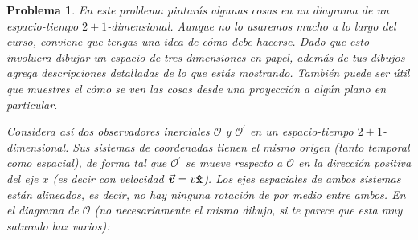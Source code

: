 \documentclass[12pt]{article}
\theoremstyle{break}
\newtheorem{exercise}{Problema}
\theoremstyle{nonumberbreak}
\DeclareRobustCommand{\uvec}[1]{{%
  \ifcsname uvec#1\endcsname
     \csname uvec#1\endcsname
   \else
    \bm{\hat{\mathbf{#1}}}%
   \fi
}}%
\newcommand*{\observer}{\mathcal{O}}
\newcommand*{\primeobserver}{\mathcal{O}^{\prime}}
\begin{document}
    \begin{exercise}
        En este problema pintarás algunas cosas en un diagrama de un espacio-tiempo \(2 + 1\)-dimensional. Aunque no lo usaremos mucho a lo largo del curso, conviene que tengas una idea de cómo debe hacerse. Dado que esto involucra dibujar un espacio de tres dimensiones en papel, además de tus dibujos agrega descripciones detalladas de lo que estás mostrando. También puede ser útil que muestres el cómo se ven las cosas desde una proyección a algún plano en particular.

        Considera así dos observadores inerciales \(\observer\) y \(\primeobserver\) en un espacio-tiempo \(2 + 1\)-dimensional. Sus sistemas de coordenadas tienen el mismo origen (tanto temporal como espacial), de forma tal que \(\primeobserver\) se mueve respecto a \(\observer\) en la dirección positiva del eje \(x\) (es decir con velocidad \(\va*{v} = v\uvec{x}\)). Los ejes espaciales de ambos sistemas están alineados, es decir, no hay ninguna rotación de por medio entre ambos. En el diagrama de \(\observer\) (no necesariamente el mismo dibujo, si te parece que esta muy saturado haz varios):


\end{exercise}
\end{document}
